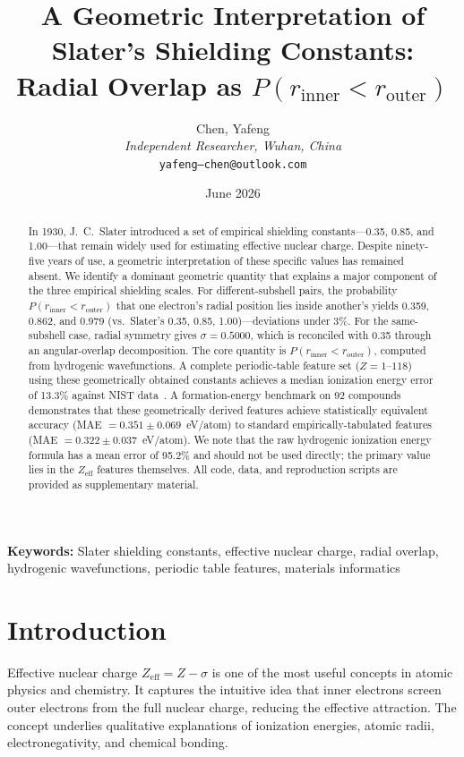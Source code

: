 \documentclass[11pt,a4paper]{article}
\title{\textbf{A Geometric Interpretation of Slater's Shielding Constants:\\[4pt]
Radial Overlap as $P(r_{\mathrm{inner}} < r_{\mathrm{outer}})$}}
\author{Chen, Yafeng\\[4pt]
\textit{Independent Researcher, Wuhan, China}\\[2pt]
\texttt{yafeng--chen@outlook.com}}
\date{June 2026}
\begin{document}
\maketitle

\begin{abstract}
In 1930, J.~C.~Slater introduced a set of empirical shielding constants---0.35, 0.85, and 1.00---that remain widely used for estimating effective nuclear charge. Despite ninety-five years of use, a geometric interpretation of these specific values has remained absent. We identify a dominant geometric quantity that explains a major component of the three empirical shielding scales. For different-subshell pairs, the probability $P(r_{\mathrm{inner}} < r_{\mathrm{outer}})$ that one electron's radial position lies inside another's yields 0.359, 0.862, and 0.979 (vs.\ Slater's 0.35, 0.85, 1.00)---deviations under 3\%. For the same-subshell case, radial symmetry gives $\sigma = 0.5000$, which is reconciled with 0.35 through an angular-overlap decomposition. The core quantity is $P(r_{\mathrm{inner}} < r_{\mathrm{outer}})$, computed from hydrogenic wavefunctions. A complete periodic-table feature set ($Z=1$--$118$) using these geometrically obtained constants achieves a median ionization energy error of 13.3\% against NIST data~\citep{nist}. A formation-energy benchmark on 92 compounds demonstrates that these geometrically derived features achieve statistically equivalent accuracy (MAE $=0.351\pm0.069$~eV/atom) to standard empirically-tabulated features (MAE $=0.322\pm0.037$~eV/atom). We note that the raw hydrogenic ionization energy formula has a mean error of 95.2\% and should not be used directly; the primary value lies in the $Z_{\mathrm{eff}}$ features themselves. All code, data, and reproduction scripts are provided as supplementary material.
\end{abstract}

\textbf{Keywords:} Slater shielding constants, effective nuclear charge, radial overlap, hydrogenic wavefunctions, periodic table features, materials informatics


\section{Introduction}

Effective nuclear charge $Z_{\mathrm{eff}} = Z - \sigma$ is one of the most useful concepts in atomic physics and chemistry. It captures the intuitive idea that inner electrons screen outer electrons from the full nuclear charge, reducing the effective attraction. The concept underlies qualitative explanations of ionization energies, atomic radii, electronegativity, and chemical bonding.
\end{document}
